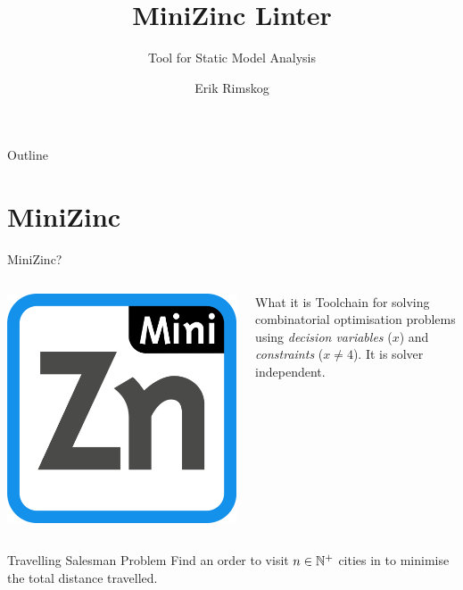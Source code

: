 \documentclass[aspectratio=169]{beamer} %
\title{MiniZinc Linter}
\subtitle{Tool for Static Model Analysis}
\author{Erik Rimskog}
\institute{Uppsala University}
\date{}
\begin{document}
\begin{frame}
  \titlepage
\end{frame}

\begin{frame}{Outline}
  \tableofcontents
\end{frame}

\section{MiniZinc}
\begin{frame}{MiniZinc?}
  \begin{columns}[onlytextwidth]
    \includegraphics[width=\textwidth]{mznlogo.png}

    \begin{block}{What it is}
      Toolchain for solving combinatorial optimisation problems\pause{} using \emph{decision variables} ($x$) and \emph{constraints} ($x\neq4$).\pause{} It is solver independent.
    \end{block}
  \end{columns}

  \vspace{0.75cm}
  \pause
  \begin{block}{Travelling Salesman Problem}
    Find an order to visit $n \in \mathbb{N}^+$ cities in to minimise the total distance travelled.
  \end{block}
\end{frame}
\end{document}
